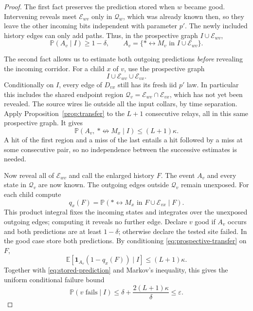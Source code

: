 \documentclass[11pt]{article}
\theoremstyle{definition}
\begin{document}
\begin{proof}
The first fact preserves the prediction stored when $w$ became good.
Intervening reveals meet $\mathcal E_{wv}$ only in $\mathcal Q_w$,
which was already known then, so they leave the other incoming bits
independent with parameter $p'$. The newly included history edges can
only add paths. Thus, in the prospective graph $I\cup\mathcal E_{wv}$,
\begin{equation}\label{eq:stored-prediction}
 \mathbb P(A_v\mid I)\ge1-\delta,
 \qquad A_v=\{*\leftrightarrow M_v\text{ in }I\cup\mathcal E_{wv}\}.
\end{equation}

The second fact allows us to estimate both outgoing predictions
\emph{before} revealing the incoming corridor. For a child $x$ of $v$,
use the prospective graph
\[
 I\cup\mathcal E_{wv}\cup\mathcal E_{vx}.
\]
Conditionally on $I$, every edge of $D_{vx}$ still has its fresh iid
$p'$ law. In particular this includes the shared endpoint region
$\mathcal Q_v=\mathcal E_{wv}\cap\mathcal E_{vx}$, which has not yet
been revealed. The source wires lie outside all the input collars,
by time separation. Apply Proposition~\ref{prop:transfer} to the
$L+1$ consecutive relays, all in this same prospective graph. It gives
\begin{equation}\label{eq:prospective-transfer}
 \mathbb P(A_v,\ *\nleftrightarrow M_x\mid I)\le(L+1)\kappa.
\end{equation}
A hit of the first region and a miss of the last entails a hit
followed by a miss at some consecutive pair, so no independence
between the successive estimates is needed.

Now reveal all of $\mathcal E_{wv}$ and call the enlarged history
$F$. The event $A_v$ and every state in $\mathcal Q_v$ are now known.
The outgoing edges outside $\mathcal Q_v$ remain unexposed. For each
child compute
\[
 q_x(F)=\mathbb P(*\leftrightarrow M_x\text{ in }F\cup\mathcal E_{vx}\mid F).
\]
This product integral fixes the incoming states and integrates over
the unexposed outgoing edges; computing it reveals no further edge.
Declare $v$ good if $A_v$ occurs and both predictions are at least
$1-\delta$; otherwise declare the tested site failed. In the good
case store both predictions. By conditioning
\eqref{eq:prospective-transfer} on $F$,
\[
 \mathbb E[\mathbf1_{A_v}(1-q_x(F))\mid I]\le(L+1)\kappa.
\]
Together with \eqref{eq:stored-prediction} and Markov's inequality,
this gives the uniform conditional failure bound
\begin{equation}\label{eq:conditional-test-failure}
 \mathbb P(v\text{ fails}\mid I)
 \le\delta+\frac{2(L+1)\kappa}{\delta}
 \le\varepsilon.
\end{equation}


\end{proof}
\end{document}

